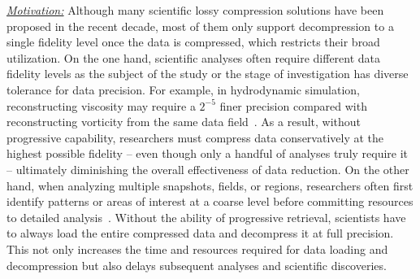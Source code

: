 \textit{\underline{Motivation:}}
Although many scientific lossy compression solutions have been proposed in the recent decade, most of them only support decompression to a single fidelity level once the data is compressed, which restricts their broad utilization.
On the one hand, scientific analyses often require different data fidelity levels as the subject of the study or the stage of investigation has diverse tolerance for data precision. For example, in hydrodynamic simulation, reconstructing viscosity may require a $2^{-5}$ finer precision compared with reconstructing vorticity from the same data field~\cite{peter-tvcg24-pframework}.
As a result, without progressive capability, researchers must compress data conservatively at the highest possible fidelity -- even though only a handful of analyses truly require it -- ultimately diminishing the overall effectiveness of data reduction.
On the other hand, when analyzing multiple snapshots, fields, or regions, researchers often first identify patterns or areas of interest at a coarse level before committing resources to detailed analysis~\cite{peter-tvcg24-pframework, pmgard, pmgard-qoi}. Without the ability of progressive retrieval, scientists have to always load the entire compressed data and decompress it at full precision. This not only increases the time and resources required for data loading and decompression but also delays subsequent analyses and scientific discoveries.

